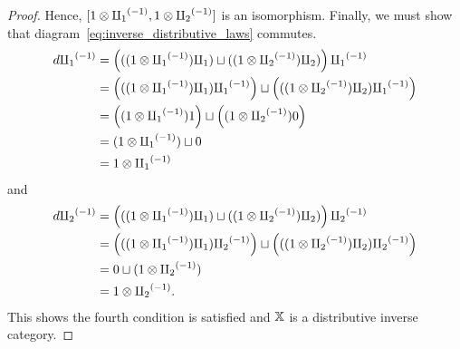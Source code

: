 \begin{proof}
  Hence, $[1\* \icpa, 1\* \icpb]$ is an isomorphism.
  Finally, we must show that diagram~\ref{eq:inverse_distributive_laws} commutes.
  \begin{align*}
    d \icpa & = \left( ((1 \* \icpa) \cpa )\djoin ((1\*\icpb) \cpb) \right)\icpa \\
     & = \left(((1 \* \icpa) \cpa )\icpa \right) \djoin \left( ((1\*\icpb) \cpb) \icpa\right) \\
     & = \left((1 \* \icpa) 1 \right) \djoin \left( (1\*\icpb) 0\right) \\
     & = (1 \* \icpa) \djoin 0\\
     & = 1 \* \icpa
  \end{align*}
  and
  \begin{align*}
    d \icpb & = \left( ((1 \* \icpa) \cpa )\djoin ((1\*\icpb) \cpb) \right)\icpb \\
     & = \left(((1 \* \icpa) \cpa )\icpb \right) \djoin \left( ((1\*\icpb) \cpb) \icpb\right) \\
     & = 0 \djoin (1 \* \icpb)\\
     & = 1 \* \icpb.
  \end{align*}
  This shows the fourth condition is satisfied and $\X$ is a distributive inverse category.
\end{proof}

